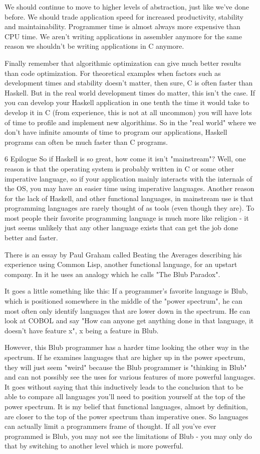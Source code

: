 \documentclass[main.tex]{subfiles}
\begin{document}
{{We should continue to move to higher levels of abstraction, just like we've done before. We should trade application speed for increased productivity, stability and maintainability. Programmer time is almost always more expensive than CPU time. We aren't writing applications in assembler anymore for the same reason we shouldn't be writing applications in C anymore.

Finally remember that algorithmic optimization can give much better results than code optimization. For theoretical examples when factors such as development times and stability doesn't matter, then sure, C is often faster than Haskell. But in the real world development times do matter, this isn't the case. If you can develop your Haskell application in one tenth the time it would take to develop it in C (from experience, this is not at all uncommon) you will have lots of time to profile and implement new algorithims. So in the "real world" where we don't have infinite amounts of time to program our applications, Haskell programs can often be much faster than C programs.

6 Epilogue
So if Haskell is so great, how come it isn't "mainstream"? Well, one reason is that the operating system is probably written in C or some other imperative language, so if your application mainly interacts with the internals of the OS, you may have an easier time using imperative languages. Another reason for the lack of Haskell, and other functional languages, in mainstream use is that programming languages are rarely thought of as tools (even though they are). To most people their favorite programming language is much more like religion - it just seems unlikely that any other language exists that can get the job done better and faster.

There is an essay by Paul Graham called Beating the Averages describing his experience using Common Lisp, another functional language, for an upstart company. In it he uses an analogy which he calls "The Blub Paradox".

It goes a little something like this: If a programmer's favorite language is Blub, which is positioned somewhere in the middle of the "power spectrum", he can most often only identify languages that are lower down in the spectrum. He can look at COBOL and say "How can anyone get anything done in that language, it doesn't have feature x", x being a feature in Blub.

However, this Blub programmer has a harder time looking the other way in the spectrum. If he examines languages that are higher up in the power spectrum, they will just seem "weird" because the Blub programmer is "thinking in Blub" and can not possibly see the uses for various features of more powerful languages. It goes without saying that this inductively leads to the conclusion that to be able to compare all languages you'll need to position yourself at the top of the power spectrum. It is my belief that functional languages, almost by definition, are closer to the top of the power spectrum than imperative ones. So languages can actually limit a programmers frame of thought. If all you've ever programmed is Blub, you may not see the limitations of Blub - you may only do that by switching to another level which is more powerful.

}}
\end{document}
